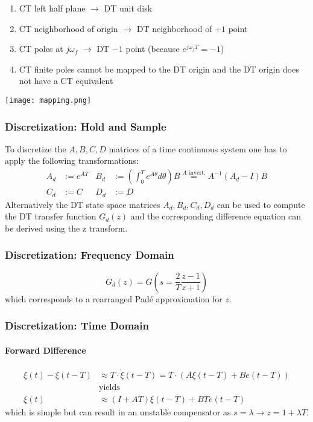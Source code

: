 
\begin{enumerate}
    \item CT left half plane $\rightarrow$ DT unit disk
    \item CT neighborhood of origin $\rightarrow$ DT neighborhood of $+1$ point
    \item CT poles at $j\omega_f$ $\rightarrow$ DT $-1$ point (because $e^{j\omega_{f}T}=-1$)
    \item CT finite poles cannot be mapped to the DT origin and the DT origin does not have a CT equivalent
\end{enumerate}

\begin{center}
    \texttt{[image: mapping.png]}
\end{center}


\subsubsection{Discretization: Hold and Sample}

To discretize the $A, B, C, D$ matrices of a time continuous system one has to apply the following transformations:
\begin{align*}
    A_d & :=e^{AT} & B_d & :=\left(\int_0^T {e^{A\theta}}d\theta\right)B \overset{A \text{ invert.}}{=} A^{-1}\left(A_d-I\right)B \\
    C_d & :=C      & D_d & :=D
\end{align*}
Alternatively the DT state space matrices $A_d, B_d, C_d, D_d$ can be used to compute the DT transfer function $G_{d}(z)$ and the corresponding difference equation can be derived using the z transform.

\subsubsection{Discretization: Frequency Domain}
\begin{equation*}
    G_{d}(z)=G\left(s=\frac2T\frac{z-1}{z+1}\right)
\end{equation*}
which corresponds to a rearranged Padé approximation for $z$.

\subsubsection{Discretization: Time Domain}

\paragraph{Forward Difference}
\noindent\begin{align*}
    \xi(t)-\xi(t-T) & \approx T\cdot\dot{\xi}(t-T) =T\cdot(A\xi(t-T)+Be(t-T)) \\
                    & \text{yields}                                           \\
    \xi(t)          & \approx(I+AT)\xi(t-T)+BTe(t-T)
\end{align*}
which is simple but can result in an unstable compensator as $s=\lambda \rightarrow z=1+\lambda T$.

